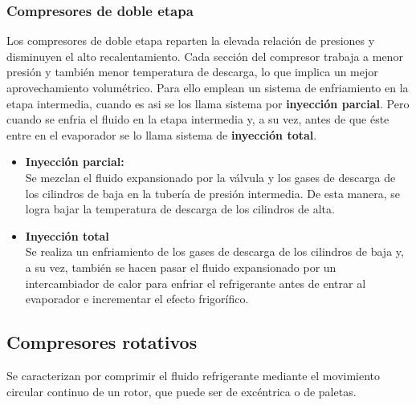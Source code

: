 \subsubsection{Compresores de doble etapa}
Los compresores de doble etapa reparten la elevada relaci\'on de presiones y disminuyen el alto recalentamiento. Cada secci\'on del compresor trabaja a menor presi\'on y tambi\'en menor temperatura de descarga, lo que implica un mejor aprovechamiento volum\'etrico. Para ello emplean un sistema de enfriamiento en la etapa intermedia, cuando es asi se los llama sistema por \textbf{inyecci\'on parcial}. Pero cuando se enfria el fluido en la etapa intermedia y, a su vez, antes de que \'este entre en el evaporador se lo llama sistema de \textbf{inyecci\'on total}.
\begin{itemize}
	\item \textbf{Inyecci\'on parcial:}\\ Se mezclan el fluido expansionado por la v\'alvula y los gases de descarga de los cilindros de baja en la tuber\'ia de presi\'on intermedia. De esta manera, se logra bajar la temperatura de descarga de los cilindros de alta.
	\item \textbf{Inyecci\'on total}\\ Se realiza un enfriamiento de los gases de descarga de los cilindros de baja y, a su vez, tambi\'en se hacen pasar el fluido expansionado por un intercambiador de calor para enfriar el refrigerante antes de entrar al evaporador e incrementar el efecto frigorífico.
\end{itemize} 
\subsection{Compresores rotativos}
Se caracterizan por comprimir el fluido refrigerante mediante el movimiento circular continuo de un rotor, que puede ser de exc\'entrica o de paletas.
